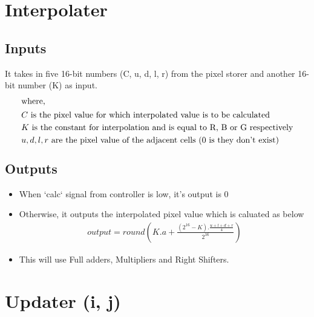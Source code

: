 \documentclass[a4paper,12pt]{article}
\begin{document}
\section{Interpolater}
\vspace*{-0.1cm}
\subsection{Inputs}
\vspace*{-0.2cm}
It takes in five 16-bit numbers (C, u, d, l, r) from the pixel storer and another 16-bit number (K) as input.
\vspace*{-0.55cm}
\begin{gather}
\intertext{where,}
\vspace*{-0.2cm}
\begin{aligned}
 &C \text{  is the pixel value for which interpolated value is to be calculated}\\
 &K \text{  is the constant for interpolation and is equal to R, B or G respectively}\\
 &u, d, l, r \text{ are the pixel value of the adjacent cells (0 is they don't exist)}
\end{aligned}\notag
\end{gather}

\subsection{Outputs} 
\vspace*{-0.2cm}
\begin{itemize}
  	\setlength{\itemsep}{-0.1cm}
	\item When `calc` signal from controller is low, it's output is 0
	\item Otherwise, it outputs the interpolated pixel value which is caluated as below
	\begin{gather}
	output = round(K.a + \frac{(2^{16} - K).\frac{u+l+d+r}{4}}{2^{16}})
	\end{gather}
	\item This will use Full adders, Multipliers and Right Shifters.
\end{itemize}

\clearpage

\vspace*{-3cm}
\section{Updater (i, j)}
\vspace*{-0.1cm}
\end{document}
